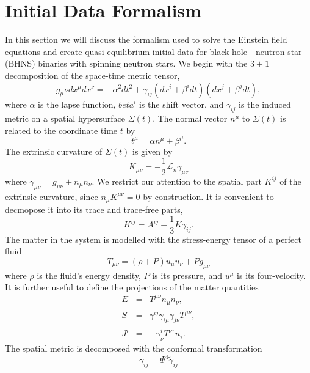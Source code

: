 \section{Initial Data Formalism}
In this section we will discuss the formalism used to solve the
Einstein field equations and create quasi-equilibrium initial data for
black-hole - neutron star (BHNS) binaries with spinning neutron
stars. We begin with the $3+1$ decomposition of the space-time metric
tensor,
\begin{equation}
g_{\mu}{\nu}dx^{\mu}dx^{\nu} = -\alpha^2dt^2 + \gamma_{ij}\left(dx^i +
  \beta^idt\right)\left(dx^j+\beta^jdt\right),
\end{equation}
where $\alpha$ is the lapse function, $beta^i$ is the shift vector,
and $\gamma_{ij}$ is the induced metric on a spatial hypersurface
$\Sigma(t)$. The normal vector $n^{\mu}$ to $\Sigma(t)$ is related to
the coordinate time $t$ by
\begin{equation}
t^{\mu} = \alpha n^{\mu} + \beta^{\mu}.
\end{equation}
The extrinsic curvature of $\Sigma(t)$ is given by
\begin{equation}
K_{\mu\nu} = -\frac{1}{2}\mathcal{L}_n\gamma_{\mu\nu}
\end{equation}
where $\gamma_{\mu\nu}=g_{\mu\nu}+n_{\mu}n_{\nu}.$ We restrict our
attention to the spatial part $K^{ij}$ of the extrinsic curvature,
since $n_{\mu}K^{\mu\nu}=0$ by construction. It is convenient to
decmopose it into its trace and trace-free parts,
\begin{equation}
K^{ij} = A^{ij}+\frac{1}{3}K\gamma_{ij}.
\end{equation}
The matter in the system is modelled with the stress-energy tensor of
a perfect fluid 
\begin{equation}
T_{\mu\nu}=\left(\rho+P\right)u_{\mu}u_{\nu}+Pg_{\mu\nu}
\end{equation}
where $\rho$ is the fluid's energy density, $P$ is its pressure, and
$u^{\mu}$ is its four-velocity. It is further useful to define the
projections of the matter quantities
\begin{eqnarray}
E &=& T^{\mu\nu}n_{\mu}n_{\nu},\\
S &=& \gamma^{ij}\gamma_{i\mu}\gamma_{j\nu}T^{\mu\nu}, \\
J^i &=& -\gamma^{i}_{\nu}T^{\nu\tau}n_{\tau}.
\end{eqnarray}
The spatial metric is decomposed with the conformal transformation
\begin{equation}
\gamma_{ij}=\Psi^4\tilde{\gamma}_{ij}
\end{equation}
